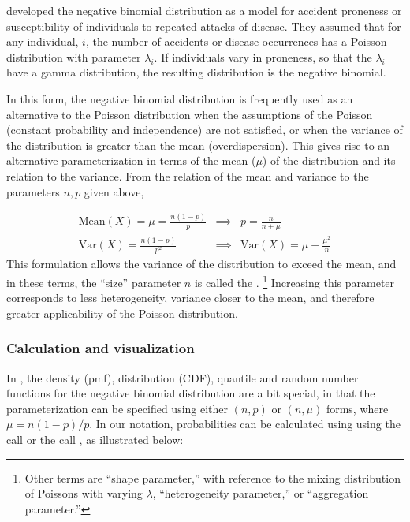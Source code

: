 \documentclass[10pt,krantz2]{krantz}\usepackage[]{graphicx}\usepackage[]{color}
\begin{document}
\citet{GreenwoodYule:20}
developed the negative binomial distribution as a model for
accident proneness or susceptibility of individuals to
repeated attacks of disease.
They assumed that for any individual, $i$, the number of accidents
or disease occurrences has a Poisson distribution with parameter
$\lambda_i$.
If individuals vary in proneness, so that the $\lambda_i$ have
a gamma distribution, the resulting distribution is the
negative binomial.

In this form, the negative binomial distribution is frequently used
as an alternative to the Poisson distribution when the assumptions
of the Poisson (constant probability and independence) are not
satisfied, or when the variance of the distribution is greater
than the mean (overdispersion).
This gives rise to an alternative parameterization in terms of the
mean ($\mu$) of the distribution and its relation to the variance.
From the relation of the mean and variance to the parameters
$n, p$ given above,

\begin{eqnarray}
\textrm{Mean}(X) = \mu = \frac{n (1-p)}{p} & \implies & p = \frac{n}{n+\mu} \\
\textrm{Var}(X) = \frac{n (1-p)}{p^2} & \implies & \textrm{Var}(X) = \mu + \frac{\mu^2}{n}
\end{eqnarray}
This formulation allows the variance of the distribution to exceed the mean,
and in these terms, the ``size'' parameter $n$ is called the
.%
\footnote{
Other terms are ``shape parameter,'' with reference to the mixing distribution
of Poissons with varying $\lambda$,
``heterogeneity parameter,'' or ``aggregation parameter.''
}
Increasing this parameter corresponds to less heterogeneity, variance closer
to the mean, and therefore greater applicability of the Poisson distribution.

\subsubsection{Calculation and visualization}

In \R, the density (pmf), distribution (CDF), quantile and random number functions
for the negative binomial distribution are a bit special, in that the parameterization
can be specified using either $(n, p)$ or $(n, \mu)$ forms,
where $\mu = n (1-p) /p$.
In our notation, probabilities can be calculated using 
using the call 
or the call , as illustrated below:
\end{document}

